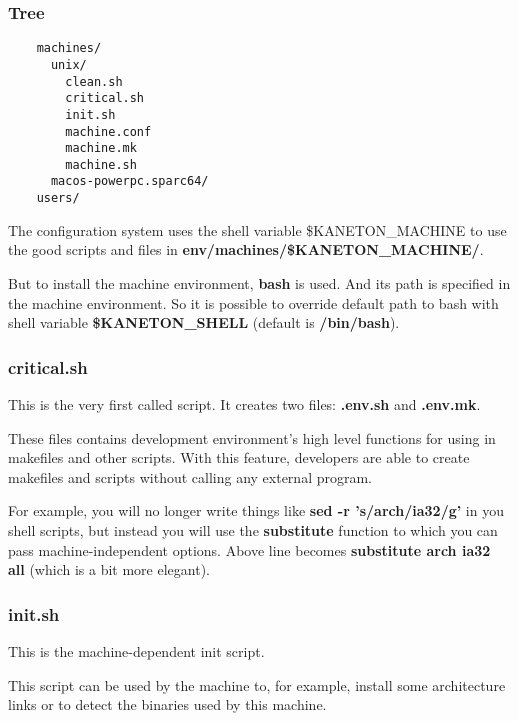 \begin{frame}[containsverbatim]
  \frametitle{Tree}

  \begin{verbatim}
    machines/
      unix/
        clean.sh
        critical.sh
        init.sh
        machine.conf
        machine.mk
        machine.sh
      macos-powerpc.sparc64/
    users/
  \end{verbatim}

  The configuration system uses the shell variable \$KANETON\_MACHINE to
  use the good scripts and files in \textbf{env/machines/\$KANETON\_MACHINE/}.

  \nl

  But to install the machine environment, \textbf{bash} is used. And its
  path is specified in the machine environment. So it is possible to override
  default path to bash with shell variable \textbf{\$KANETON\_SHELL} (default
  is \textbf{/bin/bash}).
\end{frame}


\begin{frame}
  \frametitle{critical.sh}

  This is the very first called script. It creates two files: \textbf{.env.sh}
  and \textbf{.env.mk}.

  \nl

  These files contains development environment's high level functions for using
  in makefiles and other scripts. With this feature, developers are able to
  create makefiles and scripts without calling any external program.

  \nl

  For example, you will no longer write things like
  \textbf{sed -r 's/arch/ia32/g'} in you shell scripts, but instead you will
  use the \textbf{substitute} function to which you can pass
  machine-independent options. Above line becomes
  \textbf{substitute arch ia32 all} (which is a bit more elegant).
\end{frame}


\begin{frame}
  \frametitle{init.sh}

  This is the machine-dependent init script.

  \nl

  This script can be used by the machine to, for example, install some
  architecture links or to detect the binaries used by this machine.
\end{frame}

